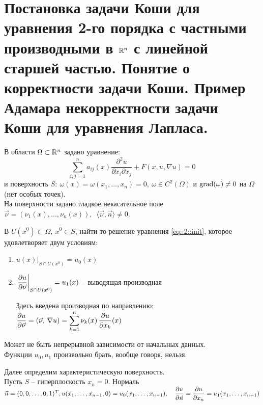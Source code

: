 \documentclass[../main.tex]{subfiles}
\begin{document}
\section[Задача Коши в \texorpdfstring{$\R^n$}{R\textasciicircum n}]{Постановка задачи Коши для уравнения 2-го порядка с частными производными в $\R^n$ с линейной старшей частью. Понятие о корректности задачи Коши. Пример Адамара некорректности задачи Коши для уравнения Лапласа.}

В области $\Omega \subset \mathbb{R}^n$ задано уравнение:
\begin{equation}
\label{eq::2::init}
\sum\limits_{i,j=1}^{n} a_{ij}(x)\frac{\partial^2u}{\partial x_i\partial x_j} + F(x, u, \nabla u) = 0
\end{equation}
и поверхность $S:\ \omega(x) = \omega(x_1, \dots, x_n) = 0,\ \omega \in C^2(\Omega)$ и $\operatorname{grad}(\omega) \not= 0$ на $\Omega$ (нет особых точек).\\
На поверхности задано гладкое некасательное поле $\vec{\nu} = (\nu_1(x), \dots, \nu_n(x)),\ \; \langle \vec{\nu}, \vec{n} \rangle \not= 0$.
\begin{definition}
В $U(x^0)\subset\Omega,\ x^0 \in S$, найти то решение уравнения \eqref{eq::2::init}, которое удовлетворяет двум условиям:
\begin{enumerate}
\item $u(x)|_{S\cap U(x^0)}=u_0(x)$
\item $\left. \dfrac{\partial u}{\partial \vec{\nu}}\right|_{S\cap U(x^0)} = u_1(x)$ -- выводящая производная

Здесь введена производная по направлению: $\dfrac{\partial u}{\partial \vec{\nu}} = \left(\vec{\nu},\, \nabla u\right) = \displaystyle\sum\limits_{k=1}^{n} \nu_k(x)\, \dfrac{\partial u}{\partial x_k}(x) $
\end{enumerate}
\end{definition}
Может не быть непрерывной зависимости от начальных данных.\\
Функции $u_0, u_1$ произвольно брать, вообще говоря, нельзя.


Далее определим характеристическую поверхность.\\
Пусть $S$ -- гиперплоскость $x_n = 0$. Нормаль $\vec{n} = (0,0,\dots,0, 1)^T,\\
u(x_1, \dots, x_{n-1}, 0) = u_0(x_1, \dots, x_{n-1}),\quad \dfrac{\partial u}{\partial\vec{n}} = \dfrac{\partial u}{\partial x_n} = u_1(x_1, \dots, x_{n-1}) $
\end{document}
